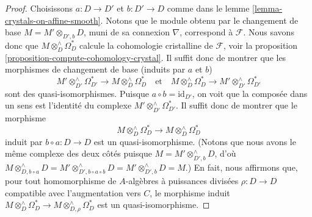 \begin{proof}
Choisissons $a : D \to D'$ et $b : D' \to D$ comme dans le
lemme \ref{lemma-crystals-on-affine-smooth}.
Notons que le module obtenu par le changement de base $M = M' \otimes_{D', b} D$, muni de sa
connexion $\nabla$, correspond à $\mathcal{F}$. Nous savons donc
que $M \otimes^\wedge_D \Omega_D^*$ calcule la cohomologie cristalline
de $\mathcal{F}$, voir la
proposition \ref{proposition-compute-cohomology-crystal}.
Il suffit donc de montrer que les morphismes de changement de base (induits
par $a$ et $b$)
$$
M' \otimes^\wedge_{D'} \Omega^*_{D'}
\longrightarrow
M \otimes^\wedge_D \Omega^*_D
\quad\text{et}\quad
M \otimes^\wedge_D \Omega^*_D
\longrightarrow
M' \otimes^\wedge_{D'} \Omega^*_{D'}
$$
sont des quasi-isomorphismes. Puisque $a \circ b = \text{id}_{D'}$, on voit
que la composée dans un sens est l'identité du complexe
$M' \otimes^\wedge_{D'} \Omega^*_{D'}$. Il suffit donc de montrer que
le morphisme
$$
M \otimes^\wedge_D \Omega^*_D
\longrightarrow
M \otimes^\wedge_D \Omega^*_D
$$
induit par $b \circ a : D \to D$ est un quasi-isomorphisme. (Notons que nous
avons le même complexe des deux côtés puisque $M = M' \otimes^\wedge_{D', b} D$,
d'où $M \otimes^\wedge_{D, b \circ a} D =
M' \otimes^\wedge_{D', b \circ a \circ b} D =
M' \otimes^\wedge_{D', b} D = M$.) En fait, nous affirmons que, pour tout
homomorphisme de $A$-algèbres à puissances divisées $\rho : D \to D$ compatible
avec l'augmentation vers $C$, le morphisme induit
$M \otimes^\wedge_D \Omega^*_D \to M \otimes^\wedge_{D, \rho} \Omega^*_D$
est un quasi-isomorphisme.


\end{proof}
